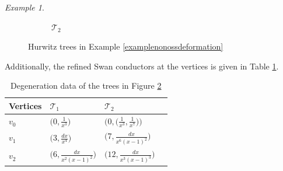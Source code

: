 \documentclass{compositio}
\theoremstyle{remark}
\newtheorem{example}[theorem]{Example}
\theoremstyle{remark}
\begin{document}
\begin{example}
\begin{figure}[h]
\begin{subfigure}{.5\textwidth}
  \caption{$\mathcal{T}_2$}
  \label{figexamplenonossdeformationtree2}
\end{subfigure}%
\caption{Hurwitz trees in Example \ref{examplenonossdeformation}}
\label{figexamplenonossdeformationtrees}
\end{figure}

Additionally, the refined Swan conductors at the vertices is given in Table \ref{tab:degenerationdataexamplenonossdeformation}.
\begin{table}[ht]
    \centering
\begin{tabular}{ |p{1.8cm}|p{3.7cm}|p{3.7cm}|p{3.7cm}|  }
\hline
Vertices & $\mathcal{T}_1$ & $\mathcal{T}_2$  \\
\hline
\hline
$v_0$ & $\big( 0, \frac{1}{x^{3}} \big)$ & $\big( 0, \big(\frac{1}{x^{3}}, \frac{1}{x^7} \big) \big) $\\
\hline
$v_1$ & $\big( 3, \frac{dx}{x^4} \big)$ & $\big( 7, \frac{dx}{x^{6}(x-1)^{2}} \big)$\\
\hline
$v_2$ & $\big( 6, \frac{dx}{x^{2}(x-1)^{2}} \big)$ & $\big( 12, \frac{dx}{x^{3}(x-1)^{3}} \big)$  \\
\hline
\end{tabular}
    \caption{Degeneration data of the trees in Figure \ref{figexamplenonossdeformationtrees}}
    \label{tab:degenerationdataexamplenonossdeformation}
\end{table}
\end{example}
\end{document}
